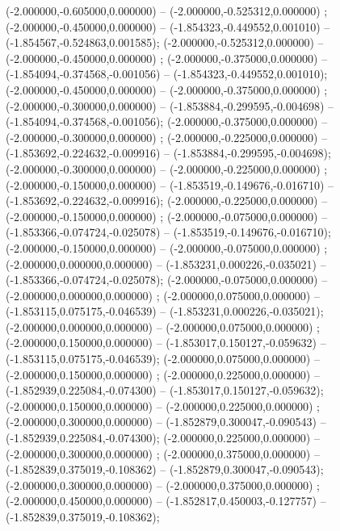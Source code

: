  (-2.000000,-0.605000,0.000000) -- (-2.000000,-0.525312,0.000000) ;
 (-2.000000,-0.450000,0.000000) -- (-1.854323,-0.449552,0.001010) -- (-1.854567,-0.524863,0.001585);
 (-2.000000,-0.525312,0.000000) -- (-2.000000,-0.450000,0.000000) ;
 (-2.000000,-0.375000,0.000000) -- (-1.854094,-0.374568,-0.001056) -- (-1.854323,-0.449552,0.001010);
 (-2.000000,-0.450000,0.000000) -- (-2.000000,-0.375000,0.000000) ;
 (-2.000000,-0.300000,0.000000) -- (-1.853884,-0.299595,-0.004698) -- (-1.854094,-0.374568,-0.001056);
 (-2.000000,-0.375000,0.000000) -- (-2.000000,-0.300000,0.000000) ;
 (-2.000000,-0.225000,0.000000) -- (-1.853692,-0.224632,-0.009916) -- (-1.853884,-0.299595,-0.004698);
 (-2.000000,-0.300000,0.000000) -- (-2.000000,-0.225000,0.000000) ;
 (-2.000000,-0.150000,0.000000) -- (-1.853519,-0.149676,-0.016710) -- (-1.853692,-0.224632,-0.009916);
 (-2.000000,-0.225000,0.000000) -- (-2.000000,-0.150000,0.000000) ;
 (-2.000000,-0.075000,0.000000) -- (-1.853366,-0.074724,-0.025078) -- (-1.853519,-0.149676,-0.016710);
 (-2.000000,-0.150000,0.000000) -- (-2.000000,-0.075000,0.000000) ;
 (-2.000000,0.000000,0.000000) -- (-1.853231,0.000226,-0.035021) -- (-1.853366,-0.074724,-0.025078);
 (-2.000000,-0.075000,0.000000) -- (-2.000000,0.000000,0.000000) ;
 (-2.000000,0.075000,0.000000) -- (-1.853115,0.075175,-0.046539) -- (-1.853231,0.000226,-0.035021);
 (-2.000000,0.000000,0.000000) -- (-2.000000,0.075000,0.000000) ;
 (-2.000000,0.150000,0.000000) -- (-1.853017,0.150127,-0.059632) -- (-1.853115,0.075175,-0.046539);
 (-2.000000,0.075000,0.000000) -- (-2.000000,0.150000,0.000000) ;
 (-2.000000,0.225000,0.000000) -- (-1.852939,0.225084,-0.074300) -- (-1.853017,0.150127,-0.059632);
 (-2.000000,0.150000,0.000000) -- (-2.000000,0.225000,0.000000) ;
 (-2.000000,0.300000,0.000000) -- (-1.852879,0.300047,-0.090543) -- (-1.852939,0.225084,-0.074300);
 (-2.000000,0.225000,0.000000) -- (-2.000000,0.300000,0.000000) ;
 (-2.000000,0.375000,0.000000) -- (-1.852839,0.375019,-0.108362) -- (-1.852879,0.300047,-0.090543);
 (-2.000000,0.300000,0.000000) -- (-2.000000,0.375000,0.000000) ;
 (-2.000000,0.450000,0.000000) -- (-1.852817,0.450003,-0.127757) -- (-1.852839,0.375019,-0.108362);
